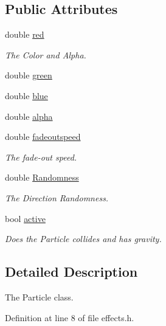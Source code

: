 \subsection*{Public Attributes}
\begin{DoxyCompactItemize}
\item 
double \hyperlink{classc_m_particle_ad88df0d1dc8eb30154ccb48de8be4e72}{red}
\begin{DoxyCompactList}\small\item\em The Color and Alpha. \end{DoxyCompactList}\item 
double \hyperlink{classc_m_particle_a7dc2ceeb185589e0f2184c966739455d}{green}
\item 
double \hyperlink{classc_m_particle_a33cefdbb5990e03af063388f34c64f1d}{blue}
\item 
double \hyperlink{classc_m_particle_abe1351cba41b5c22228f57634bb91c94}{alpha}
\item 
double \hyperlink{classc_m_particle_a6c9e380fd94779a7494c217096751156}{fadeoutspeed}
\begin{DoxyCompactList}\small\item\em The fade-\/out speed. \end{DoxyCompactList}\item 
double \hyperlink{classc_m_particle_a6df51f38f42317961cbdd55dca8f20fa}{Randomness}
\begin{DoxyCompactList}\small\item\em The Direction Randomness. \end{DoxyCompactList}\item 
bool \hyperlink{classc_m_particle_a08fb4f55e8af895d93501ec009bb138c}{active}
\begin{DoxyCompactList}\small\item\em Does the Particle collides and has gravity. \end{DoxyCompactList}\end{DoxyCompactItemize}


\subsection{Detailed Description}
The Particle class. 

Definition at line 8 of file effects.\-h.



